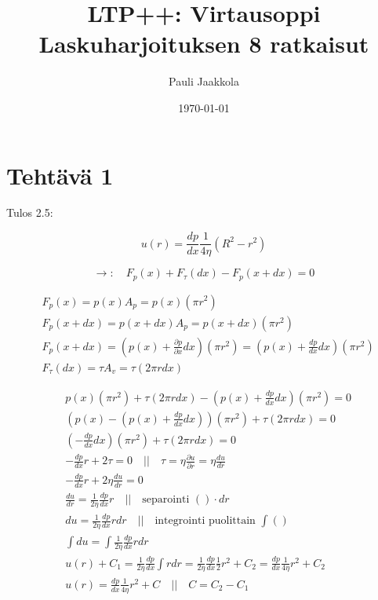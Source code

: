 \documentclass[12pt,a4paper,finnish]{article}
\title{LTP++: Virtausoppi\\Laskuharjoituksen 8 ratkaisut}
\date{\today}
\author{Pauli Jaakkola}
\begin{document}
\maketitle
\tableofcontents
\newpage

\section{Tehtävä 1}

Tulos 2.5:

\begin{framed}
 \begin{equation}
  u(r) = \frac{dp}{dx}\frac{1}{4\eta}(R^2 - r^2)
 \end{equation}
\end{framed}

\begin{equation}
 \rightarrow : \quad F_p(x) + F_{\tau}(dx) - F_p(x + dx) = 0
\end{equation}

\begin{align}
 &F_p(x) = p(x)A_p = p(x)(\pi r^2)\\
 &F_p(x + dx) = p(x + dx)A_p = p(x + dx)(\pi r^2)\\
 &F_p(x + dx) = \left(p(x) + \frac{\partial p}{\partial x}dx\right)(\pi r^2) = \left(p(x) + \frac{dp}{dx}dx\right)(\pi r^2)\\
 &F_{\tau}(dx) = \tau A_v = \tau(2\pi r dx)
\end{align}

\begin{align}
 &p(x)(\pi r^2) + \tau(2\pi r dx) - \left(p(x) + \frac{dp}{dx}dx\right)(\pi r^2) = 0\\
 &\left(p(x) - \left(p(x) + \frac{dp}{dx}dx\right)\right)(\pi r^2) + \tau(2\pi r dx) = 0\\
 &\left(-\frac{dp}{dx}dx\right)(\pi r^2) + \tau(2\pi r dx) = 0\\
 &-\frac{dp}{dx}r + 2\tau = 0 \quad \bigg|\bigg| \quad \tau = \eta\frac{\partial u}{\partial r} = \eta\frac{du}{dr}\\
 &-\frac{dp}{dx}r + 2\eta\frac{du}{dr} = 0\\
 &\frac{du}{dr} = \frac{1}{2\eta}\frac{dp}{dx}r \quad \bigg|\bigg| \quad \text{separointi } ()\cdot dr\\
 &du = \frac{1}{2\eta}\frac{dp}{dx}rdr \quad \bigg|\bigg| \quad \text{integrointi puolittain } \int ()\\
 &\int du = \int\frac{1}{2\eta}\frac{dp}{dx}rdr\\
 &u(r) + C_1 = \frac{1}{2\eta}\frac{dp}{dx}\int rdr = \frac{1}{2\eta}\frac{dp}{dx}\frac{1}{2}r^2 + C_2 = \frac{dp}{dx}\frac{1}{4\eta}r^2 + C_2\\
 &u(r) = \frac{dp}{dx}\frac{1}{4\eta}r^2 + C \quad \bigg|\bigg| \quad C = C_2 - C_1
\end{align}
\end{document}
